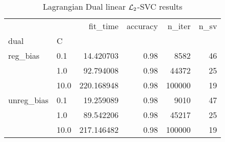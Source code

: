 \begin{table}[H]
\centering
\caption{Lagrangian Dual linear $\protect \mathcal{L}_2$-SVC results}
\label{linear_lagrangian_dual_l2_svc_cv_results}
\begin{tabular}{llrrrr}
\toprule
           &      &    fit\_time &  accuracy &  n\_iter &  n\_sv \\
dual & C &             &           &         &       \\
\midrule
reg\_bias & 0.1  &   14.420703 &      0.98 &    8582 &    46 \\
           & 1.0  &   92.794008 &      0.98 &   44372 &    25 \\
           & 10.0 &  220.168948 &      0.98 &  100000 &    19 \\
unreg\_bias & 0.1  &   19.259089 &      0.98 &    9010 &    47 \\
           & 1.0  &   89.542206 &      0.98 &   45217 &    25 \\
           & 10.0 &  217.146482 &      0.98 &  100000 &    19 \\
\bottomrule
\end{tabular}
\end{table}
